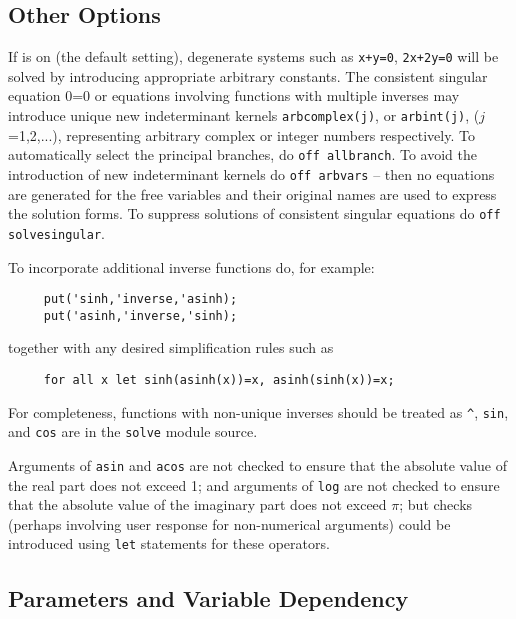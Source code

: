 \subsection{Other Options}
\hypertarget{switch:SOLVESINGULAR}{}
\hypertarget{switch:ALLBRANCH}{}
\hypertarget{switch:ARBVARS}{}
\hypertarget{operator:ARBCOMPLEX}{}
\hypertarget{operator:ARBINT}{}
If  is on (the default setting),
degenerate systems such as \texttt{x+y=0}, \texttt{2x+2y=0} will be solved by
introducing appropriate arbitrary constants.
The consistent singular equation 0=0 or equations involving functions with
multiple inverses may introduce unique new indeterminant kernels
\texttt{arbcomplex(j)}, or \texttt{arbint(j)}, ($j$=1,2,...),  %
representing arbitrary complex or integer numbers respectively.  To
automatically select the principal branches, do \texttt{off allbranch}.
 To avoid the introduction of new indeterminant kernels
do \texttt{off arbvars} -- then no equations are generated for the free
variables and their original names are used to express the solution forms.
To suppress solutions of consistent singular equations do
\texttt{off solvesingular}.

To incorporate additional inverse functions do, for example:
\begin{verbatim}
     put('sinh,'inverse,'asinh);
     put('asinh,'inverse,'sinh);
\end{verbatim}
together with any desired simplification rules such as
\begin{verbatim}
     for all x let sinh(asinh(x))=x, asinh(sinh(x))=x;
\end{verbatim}
For completeness, functions with non-unique inverses should be treated as
\texttt{\textasciicircum}, \texttt{sin}, and \texttt{cos} are in the \texttt{solve}
module source.

Arguments of \texttt{asin} and \texttt{acos} are not checked to ensure that the
absolute value of the real part does not exceed 1; and arguments of
\texttt{log} are not checked to  ensure that the absolute value of the imaginary
part does not exceed $\pi$; but checks (perhaps involving user response
for non-numerical arguments) could be introduced using
\texttt{let} statements for these operators.

\subsection{Parameters and Variable Dependency}

